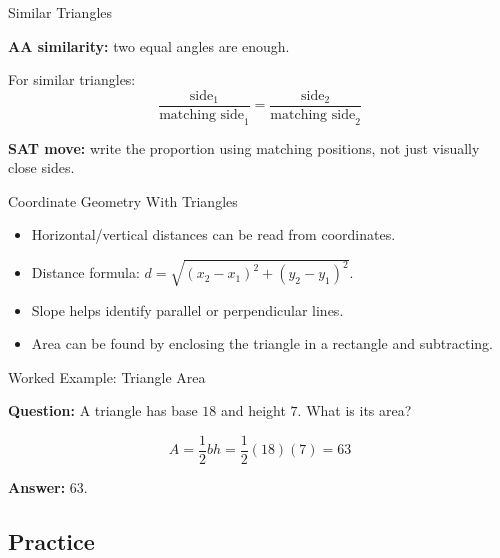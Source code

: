 \documentclass{beamer}
\begin{document}
\begin{frame}{Similar Triangles}

\textbf{AA similarity:} two equal angles are enough.

\vspace{0.2cm}
For similar triangles:
\[
\dfrac{\text{side}_1}{\text{matching side}_1}
=
\dfrac{\text{side}_2}{\text{matching side}_2}
\]

\vspace{0.2cm}
\textbf{SAT move:} write the proportion using matching positions, not just visually close sides.

\end{frame}

\begin{frame}{Coordinate Geometry With Triangles}

\begin{itemize}
    \item Horizontal/vertical distances can be read from coordinates.
    \item Distance formula: $d=\sqrt{(x_2-x_1)^2+(y_2-y_1)^2}$.
    \item Slope helps identify parallel or perpendicular lines.
    \item Area can be found by enclosing the triangle in a rectangle and subtracting.
\end{itemize}

\end{frame}

\begin{frame}{Worked Example: Triangle Area}

\textbf{Question:} A triangle has base $18$ and height $7$. What is its area?

\vspace{0.2cm}
\[
A=\dfrac{1}{2}bh=\dfrac{1}{2}(18)(7)=63
\]

\textbf{Answer:} $\boxed{63}$.

\end{frame}

\begin{frame}
\section{Practice}
\end{frame}
\end{document}
